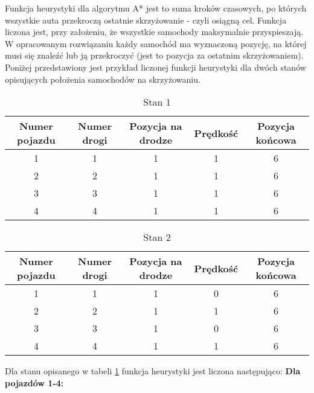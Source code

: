 Funkcja heurystyki dla algorytmu A* jest to suma kroków czasowych, po których wszystkie auta przekroczą ostatnie skrzyżowanie - czyli osiągną cel. Funkcja liczona jest, przy założeniu, że wszystkie samochody maksymalnie przyspieszają.
\newline
\newline
W opracowanym rozwiązaniu każdy samochód ma wyznaczoną pozycję, na której musi się znaleźć lub ją przekroczyć (jest to pozycja za ostatnim skrzyżowaniem). Poniżej przedstawiony jest przykład liczonej funkcji heurystyki dla dwóch stanów opisujących położenia samochodów na skrzyżowaniu.
\newline
\newline
\begin{table}[t]
    \begin{tabular}{|c|c|c|c|c|}
      \hline 
      Numer pojazdu & Numer drogi & Pozycja na drodze & Prędkość & Pozycja końcowa\\
      \hline
      1 & 1 & 1 & 1 & 6 \\
      \hline
      2 & 2 & 1 & 1 & 6 \\
      \hline
      3 & 3 & 1 & 1 & 6 \\
      \hline
      4 & 4 & 1 & 1 & 6 \\
      \hline
    \end{tabular} 
    \caption{Stan 1}
    \label{FirstState}
\end{table}
\newline
\begin{table}[t]
    \begin{tabular}{|c|c|c|c|c|}
      \hline 
      Numer pojazdu & Numer drogi & Pozycja na drodze & Prędkość & Pozycja końcowa\\
      \hline
      1 & 1 & 1 & 0 & 6 \\
      \hline
      2 & 2 & 1 & 1 & 6 \\
      \hline
      3 & 3 & 1 & 0 & 6 \\
      \hline
      4 & 4 & 1 & 1 & 6 \\
      \hline
    \end{tabular} 
    \caption{Stan 2}
    \label{SecondState}
\end{table}
\newpage
Dla stanu opisanego w tabeli \ref{FirstState} funkcja heurystyki jest liczona następująco:
\newline
\newline
\textbf{Dla pojazdów 1-4:}
\newline
\newline
